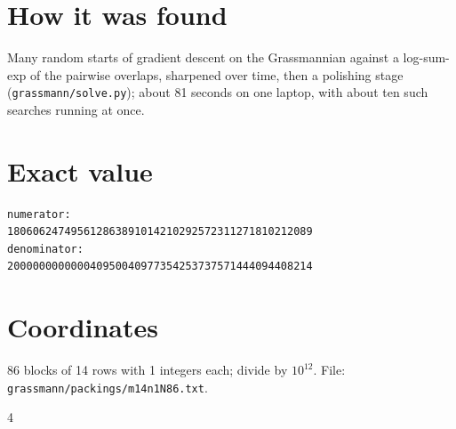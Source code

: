 \documentclass[11pt,a4paper]{article}
\begin{document}
\section{How it was found}
Many random starts of gradient descent on the Grassmannian against a log-sum-exp of the pairwise overlaps, sharpened over time, then a polishing stage (\texttt{grassmann/solve.py}); about 81 seconds on one laptop, with about ten such searches running at once.


\appendix
\section{Exact value}
{\small
\begin{verbatim}
numerator:
180606247495612863891014210292572311271810212089
denominator:
200000000000040950040977354253737571444094408214
\end{verbatim}}

\section{Coordinates}
86 blocks of 14 rows with 1 integers each; divide by $10^{12}$. File: \texttt{grassmann/packings/m14n1N86.txt}.
{\tiny
\begin{multicols}{4}
\end{multicols}}
\end{document}
